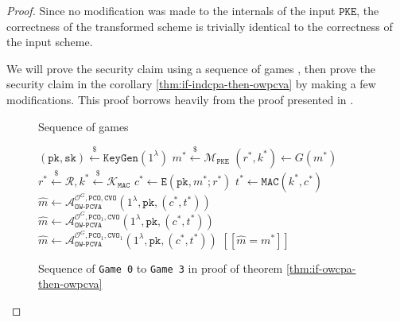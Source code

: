 \documentclass[floatrow,journal=tches,submission]{iacrtrans}
\newcommand{\monospace}{\texttt}
\newcommand{\pke}{\monospace{PKE}}
\newcommand{\keygen}{\monospace{KeyGen}}
\newcommand{\encrypt}{\monospace{E}}
\newcommand{\mac}{\monospace{MAC}}
\newcommand{\sign}{\monospace{MAC}}
\newcommand{\pk}{\monospace{pk}}
\newcommand{\sk}{\monospace{sk}}
\newcommand{\pco}{\monospace{PCO}}
\newcommand{\cvo}{\monospace{CVO}}
\newcommand{\leftsample}{\stackrel{\$}{\leftarrow}}
\newcommand{\llbrack}{[\![}
\newcommand{\rrbrack}{]\!]}
\begin{document}
\begin{proof}
    Since no modification was made to the internals of the input $\pke$, the correctness of the transformed scheme is trivially identical to the correctness of the input scheme.

    We will prove the security claim using a sequence of games \cite{shoup2004sequences}, then prove the security claim in the corollary \ref{thm:if-indcpa-then-owpcva} by making a few modifications. This proof borrows heavily from the proof presented in \cite{hofheinz2017modular}.

    \begin{figure}
        \centering

        \begin{algorithm}[H]
            \caption{Sequence of games}\label{alg:sequence-of-games}
            \begin{algorithmic}[1]
                \State $(\pk, \sk) \leftsample \keygen(1^\lambda)$
                \State $m^\ast \leftsample \mathcal{M}_\pke$
                \State $(r^\ast, k^\ast) \leftarrow G(m^\ast)$
                \State $r^\ast \leftsample \mathcal{R}, k^\ast \leftsample \mathcal{K}_\mac$
                \State $c^\ast \leftarrow \encrypt(\pk, m^\ast; r^\ast)$
                \State $t^\ast \leftarrow \sign(k^\ast, c^\ast)$
                \State $
                    \hat{m} \leftarrow \mathcal{A}^{\mathcal{O}^G, \pco, \cvo}_\monospace{OW-PCVA}(
                        1^\lambda, \pk, (c^\ast, t^\ast)
                    )
                $
                \State $
                    \hat{m} \leftarrow \mathcal{A}^{\mathcal{O}^G, \pco_1, \cvo}_\monospace{OW-PCVA}(
                        1^\lambda, \pk, (c^\ast, t^\ast)
                    )
                $
                \State $
                    \hat{m} \leftarrow \mathcal{A}^{\mathcal{O}^G, \pco_1, \cvo_1}_\monospace{OW-PCVA}(
                        1^\lambda, \pk, (c^\ast, t^\ast)
                    )
                $
                \State \Return $\llbrack \hat{m} = m^\ast \rrbrack$
            \end{algorithmic}
        \end{algorithm}
        
        \caption{Sequence of \monospace{Game 0} to \monospace{Game 3} in proof of theorem \ref{thm:if-owcpa-then-owpcva}}
        \label{fig:enter-label}
    \end{figure}


\end{proof}
\end{document}
